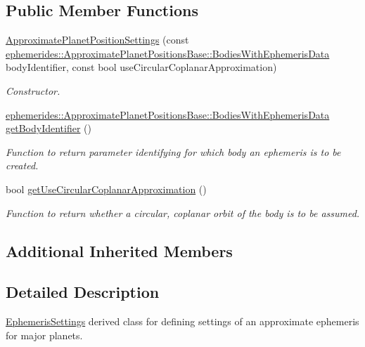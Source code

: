 \subsection*{Public Member Functions}
\begin{DoxyCompactItemize}
\item 
\hyperlink{classtudat_1_1simulation__setup_1_1ApproximatePlanetPositionSettings_ad8f06740d82644b5cc3f329b5fd80168}{Approximate\+Planet\+Position\+Settings} (const \hyperlink{classtudat_1_1ephemerides_1_1ApproximatePlanetPositionsBase_aa698885dcabac2815a6205d5502724d2}{ephemerides\+::\+Approximate\+Planet\+Positions\+Base\+::\+Bodies\+With\+Ephemeris\+Data} body\+Identifier, const bool use\+Circular\+Coplanar\+Approximation)
\begin{DoxyCompactList}\small\item\em Constructor. \end{DoxyCompactList}\item 
\hyperlink{classtudat_1_1ephemerides_1_1ApproximatePlanetPositionsBase_aa698885dcabac2815a6205d5502724d2}{ephemerides\+::\+Approximate\+Planet\+Positions\+Base\+::\+Bodies\+With\+Ephemeris\+Data} \hyperlink{classtudat_1_1simulation__setup_1_1ApproximatePlanetPositionSettings_ae70bc8743a4e118b0f855bb78632964f}{get\+Body\+Identifier} ()
\begin{DoxyCompactList}\small\item\em Function to return parameter identifying for which body an ephemeris is to be created. \end{DoxyCompactList}\item 
bool \hyperlink{classtudat_1_1simulation__setup_1_1ApproximatePlanetPositionSettings_af33366b088c3eb28976b31f6968580de}{get\+Use\+Circular\+Coplanar\+Approximation} ()
\begin{DoxyCompactList}\small\item\em Function to return whether a circular, coplanar orbit of the body is to be assumed. \end{DoxyCompactList}\end{DoxyCompactItemize}
\subsection*{Additional Inherited Members}


\subsection{Detailed Description}
\hyperlink{classtudat_1_1simulation__setup_1_1EphemerisSettings}{Ephemeris\+Settings} derived class for defining settings of an approximate ephemeris for major planets.

